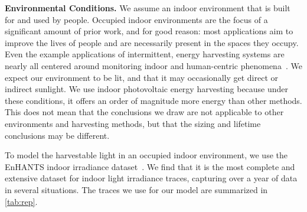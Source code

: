 \vspace{-6pt}
\noindent
\textbf{Environmental Conditions.}
We
assume an indoor environment
that is built for and used
by people.
Occupied indoor environments are the focus of a significant
amount of
prior work, %
and for good reason: most
applications aim to improve the lives of people and are necessarily present
in the spaces they occupy. Even the example applications of intermittent,
energy harvesting systems are nearly all centered around monitoring
indoor and human-centric phenomena~\cite{hesterTimely17,hesterFlicker17,colinReconfigurable18,campbellEnergy14}.
We expect our environment to be lit, and that it may
occasionally get direct or indirect sunlight. We use
indoor photovoltaic energy harvesting because under these conditions,
it offers an order of magnitude more energy than other methods.
This does not mean that the conclusions we draw are not applicable to other
environments and harvesting methods, but that the sizing and lifetime
conclusions may be different.

To model the harvestable light in an occupied indoor environment, we use
the EnHANTS indoor irradiance dataset~\cite{gorlatova2013networking}. We
find that it is the most complete and extensive dataset for indoor light
irradiance traces, capturing over a year of data in several situations.
The traces we use for our model are summarized in \cref{tab:rep}.\\

